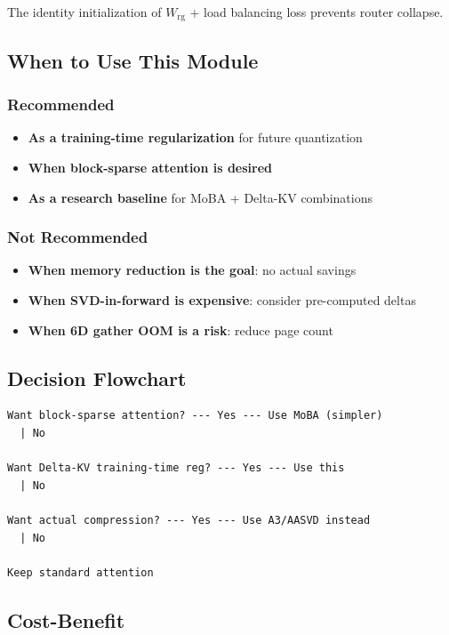 The identity initialization of $W_\text{rg}$ + load balancing loss prevents 
router collapse.

\subsection{When to Use This Module}

\subsubsection{Recommended}
\begin{itemize}
\item \textbf{As a training-time regularization} for future quantization
\item \textbf{When block-sparse attention is desired}
\item \textbf{As a research baseline} for MoBA + Delta-KV combinations

\end{itemize}
\subsubsection{Not Recommended}
\begin{itemize}
\item \textbf{When memory reduction is the goal}: no actual savings
\item \textbf{When SVD-in-forward is expensive}: consider pre-computed deltas
\item \textbf{When 6D gather OOM is a risk}: reduce page count

\end{itemize}
\subsection{Decision Flowchart}

\begin{lstlisting}
Want block-sparse attention? --- Yes --- Use MoBA (simpler)
  | No
   
Want Delta-KV training-time reg? --- Yes --- Use this
  | No
   
Want actual compression? --- Yes --- Use A3/AASVD instead
  | No
   
Keep standard attention
\end{lstlisting}

\subsection{Cost-Benefit}

